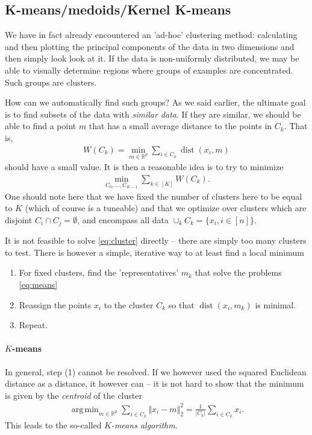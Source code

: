 \documentclass{article}
\DeclareMathOperator*{\argmin}{arg\,min}
\newcommand{\R}{\mathbb{R}}
\newcommand{\abs}[1]{\vert #1 \vert}
\newcommand{\norm}[1]{\Vert #1 \Vert}
\DeclareMathOperator{\dist}{dist}
\begin{document}
\subsection{K-means/medoids/Kernel K-means}
We have in fact already encountered an 'ad-hoc' clustering method: calculating and then plotting the principal components of the data in two dimensions and then simply look look at it. If the data is non-uniformly distributed, we may be able to visually determine regions where groups of examples are concentrated. Such groups are clusters. 

How can we automatically find such groups? As we said earlier, the ultimate goal is to find subsets of the data with \emph{similar data}. If they are similar, we should be able to find a point $m$ that has a small average distance to the points in $C_k$. That is,
\begin{align}
    W(C_k) = \min_{m\in \R^p} \sum_{i \in C_k} \dist(x_i,m) \label{eq:means}
\end{align}
should have a small value. It is then a reasonable idea is to try to minimize
\begin{align} \label{eq:cluster}
    \min_{C_0, \dots, C_{K-1}} \sum_{k \in [K]} W(C_k).
\end{align}
One should note here that we have fixed the number of clusters here to be equal to $K$ (which of course is a tuneable) and that we optimize over clusters which are disjoint $C_i \cap C_j=\emptyset$, and encompass all data $\cup_{k} C_k = \{x_i, i \in [n]\}$.

It is not feasible to solve \eqref{eq:cluster} directly -- there are simply too many clusters to test. There is however a simple, iterative way to at least find a local minimum
\begin{enumerate}
    \item For fixed clusters, find the 'representatives' $m_k$ that solve the problems \eqref{eq:means}
    \item Reassign the points $x_i$ to the cluster $C_k$ so that $\dist(x_i,m_k)$ is minimal.
    \item Repeat.
\end{enumerate}


\paragraph{$K$-means} 
In general, step (1) cannot be resolved. If we however used the squared Euclidean distance as a distance, it however can -- it is not hard to show that the minimum is given by the \emph{centroid} of the cluster
\begin{align*}
    \argmin_{m\in \R^p} \sum_{i \in C_k} \norm{x_i-m}_2^2 = \frac{1}{\abs{C_k}}\sum_{i \in C_k}x_i.
\end{align*}
This leads to the so-called \emph{$K$-means algorithm}.
\end{document}
